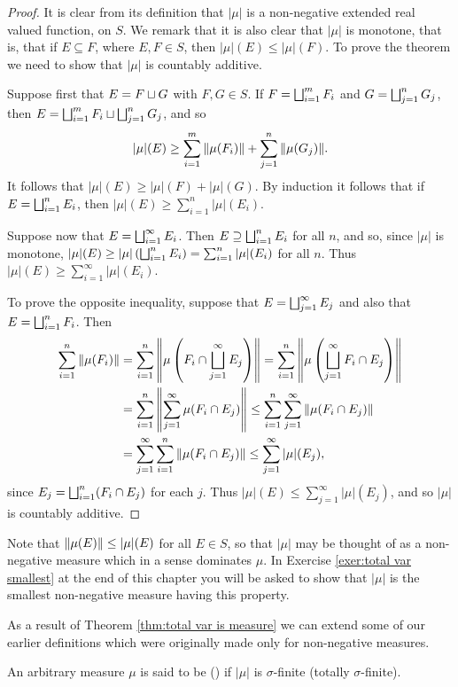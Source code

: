 \begin{proof}
It is clear from its definition that $|\mu|$ is a non-negative extended real valued function, on $S$. We remark that it is also clear that $|\mu|$ is monotone, that is, that if $E\subseteq F$, where $E, F\in S$, then $|\mu|(E)\leq|\mu|(F)$. To prove the theorem we need to show that $|\mu|$ is countably additive.

Suppose first that $E=F\sqcup G$ with $F,G\in S$. If $F=\bigsqcup_{i=1}^mF_i$ and $G=\bigsqcup_{j=1}^nG_j$, then $E=\bigsqcup_{i=1}^mF_i\sqcup\bigsqcup_{j=1}^nG_j$, and so \[|\mu|(E)\geq\sum_{i=1}^m\norm{\mu(F_i)}+\sum_{j=1}^n\norm{\mu(G_j)}.\] It follows that $|\mu|(E)\geq|\mu|(F)+|\mu|(G)$. By induction it follows that if $E=\bigsqcup_{i=1}^nE_i$, then $|\mu|(E)\geq\sum_{i=1}^n|\mu|(E_i)$.

Suppose now that $E=\bigsqcup_{i=1}^\infty E_i$. Then $E\supseteq\bigsqcup_{i=1}^nE_i$ for all $n$, and so, since $|\mu|$ is monotone, $|\mu|(E)\geq|\mu|\left(\bigsqcup_{i=1}^nE_i\right)=\sum_{i=1}^n|\mu|(E_i)$ for all $n$. Thus $|\mu|(E)\geq\sum_{i=1}^\infty|\mu|(E_i)$.

To prove the opposite inequality, suppose that $E=\bigsqcup_{j=1}^\infty E_j$ and also that $E=\bigsqcup_{i=1}^nF_i$. Then
\begin{align*}
    \sum_{i=1}^n\norm{\mu(F_i)}&=\sum_{i=1}^n\norm{\mu\left(F_i\cap\bigsqcup_{j=1}^\infty E_j\right)}=\sum_{i=1}^n\norm{\mu\left(\bigsqcup_{j=1}^\infty F_i\cap E_j\right)}\\
    &=\sum_{i=1}^n\norm{\sum_{j=1}^\infty\mu(F_i\cap E_j)}\leq\sum_{i=1}^n\sum_{j=1}^\infty\norm{\mu(F_i\cap E_j)}\\
    &=\sum_{j=1}^\infty\sum_{i=1}^n\norm{\mu(F_i\cap E_j)}\leq\sum_{j=1}^\infty|\mu|(E_j),
\end{align*}
since $E_j=\bigsqcup_{i=1}^n(F_i\cap E_j)$ for each $j$. Thus $|\mu|(E)\leq\sum_{j=1}^\infty|\mu|(E_j)$, and so $|\mu|$ is countably additive.
\end{proof}

Note that $\norm{\mu(E)}\leq|\mu|(E)$ for all $E\in S$, so that $|\mu|$ may be thought of as a non-negative measure which in a sense dominates $\mu$. In Exercise \ref{exer:total var smallest} at the end of this chapter you will be asked to show that $|\mu|$ is the smallest non-negative measure having this property.

As a result of Theorem \ref{thm:total var is measure} we can extend some of our earlier definitions which were originally made only for non-negative measures.

\begin{definition}
An arbitrary measure $\mu$ is said to be  () if $|\mu|$ is $\sigma$-finite (totally $\sigma$-finite).
\end{definition}

